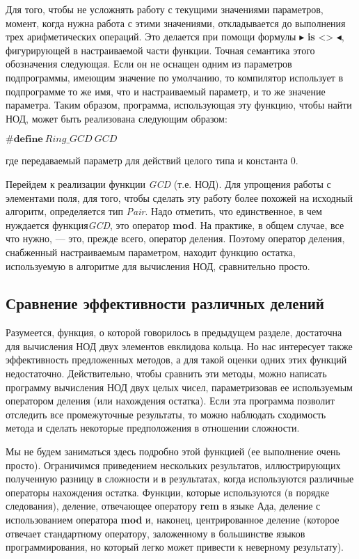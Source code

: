 Для того, чтобы не усложнять работу с текущими значениями параметров, момент, когда нужна работа с этими значениями, откладывается до выполнения трех арифметических операций. Это делается при помощи формулы $\blacktriangleright$ \textbf{is} <> $\blacktriangleleft$, фигурирующей в настраиваемой части функции. Точная семантика этого обозначения следующая. Если он не оснащен одним из параметров подпрограммы, имеющим значение по умолчанию, то компилятор использует в подпрограмме то же имя, что и настраиваемый параметр, и то же значение параметра. Таким образом, программа, использующая эту функцию, чтобы найти НОД, может быть реализована следующим образом:\newline 

$\# \textbf{define}\: Ring\_ GCD\: GCD$\newline

\noindent где передаваемый параметр для действий целого типа и константа 0.\newline
 
Перейдем к реализации функции \textit{GCD} (т.е. НОД). Для упрощения 
работы с элементами поля, для того, чтобы сделать эту работу более 
похожей на исходный алгоритм, определяется тип \textit{Pair}. Надо отметить, 
что единственное, в чем нуждается функция\textit{GCD}, это оператор \textbf{mod}. 
На практике, в общем случае, все что нужно, — это, прежде всего,  
оператор деления. Поэтому оператор деления, снабженный настраиваемым 
параметром, находит функцию остатка, используемую в алгоритме для 
вычисления НОД, сравнительно просто. 

\subsection{Сравнение эффективности различных делений}
Разумеется, функция, о которой говорилось в предыдущем разделе, достаточна для вычисления НОД двух элементов евклидова кольца. Но нас интересует также эффективность предложенных методов, а для такой оценки одних этих функций недостаточно. Действительно, чтобы сравнить эти методы, можно написать программу вычисления НОД двух целых чисел, параметризовав ее используемым оператором деления (или нахождения остатка). Если эта программа позволит отследить все промежуточные результаты, то можно наблюдать сходимость метода и сделать некоторые предположения в отношении сложности.

 Мы не будем заниматься здесь подробно этой функцией (ее выполнение очень просто). Ограничимся приведением нескольких результатов, иллюстрирующих полученную разницу в сложности и в результатах, когда используются различные операторы нахождения остатка. Функции, которые используются (в порядке следования), деление, отвечающее оператору \textbf{rem} в языке Ада, деление с использованием оператора \textbf{mod} и, наконец, центрированное деление (которое отвечает стандартному оператору, заложенному в большинстве языков программирования, но который
легко может привести к неверному результату).
\pagebreak

